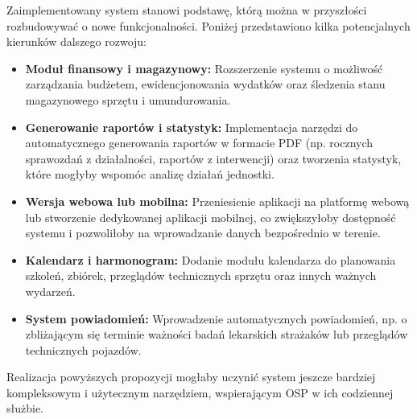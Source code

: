 Zaimplementowany system stanowi podstawę, którą można w przyszłości rozbudowywać o nowe funkcjonalności. Poniżej przedstawiono kilka potencjalnych kierunków dalszego rozwoju:
\begin{itemize}
    \item \textbf{Moduł finansowy i magazynowy:} Rozszerzenie systemu o możliwość zarządzania budżetem, ewidencjonowania wydatków oraz śledzenia stanu magazynowego sprzętu i umundurowania.
    \item \textbf{Generowanie raportów i statystyk:} Implementacja narzędzi do automatycznego generowania raportów w formacie PDF (np. rocznych sprawozdań z działalności, raportów z interwencji) oraz tworzenia statystyk, które mogłyby wspomóc analizę działań jednostki.
    \item \textbf{Wersja webowa lub mobilna:} Przeniesienie aplikacji na platformę webową lub stworzenie dedykowanej aplikacji mobilnej, co zwiększyłoby dostępność systemu i pozwoliłoby na wprowadzanie danych bezpośrednio w terenie.
    \item \textbf{Kalendarz i harmonogram:} Dodanie modułu kalendarza do planowania szkoleń, zbiórek, przeglądów technicznych sprzętu oraz innych ważnych wydarzeń.
    \item \textbf{System powiadomień:} Wprowadzenie automatycznych powiadomień, np. o zbliżającym się terminie ważności badań lekarskich strażaków lub przeglądów technicznych pojazdów.
\end{itemize}

Realizacja powyższych propozycji mogłaby uczynić system jeszcze bardziej kompleksowym i użytecznym narzędziem, wspierającym OSP w ich codziennej służbie.